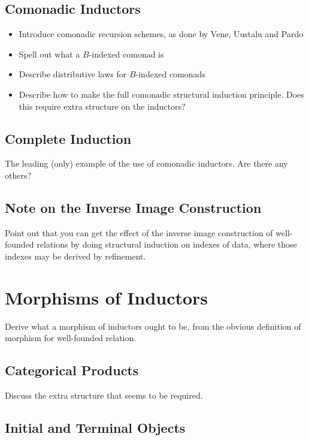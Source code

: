 \documentclass{article}
\begin{document}

\subsection{Comonadic Inductors}

\begin{itemize}
\item Introduce comonadic recursion schemes, as done by Vene, Uustalu
  and Pardo
\item Spell out what a $B$-indexed comonad is
\item Describe distributive laws for $B$-indexed comonads
\item Describe how to make the full comonadic structural induction
  principle. Does this require extra structure on the inductors?
\end{itemize}

\subsection{Complete Induction}

The leading (only) example of the use of comonadic inductors. Are
there any others?

\subsection{Note on the Inverse Image Construction}

Point out that you can get the effect of the inverse image
construction of well-founded relations by doing structural induction
on indexes of data, where those indexes may be derived by refinement.

\section{Morphisms of Inductors}

Derive what a morphism of inductors ought to be, from the obvious
definition of morphism for well-founded relation.

\subsection{Categorical Products}

Discuss the extra structure that seems to be required. 

\subsection{Initial and Terminal Objects}
\end{document}
